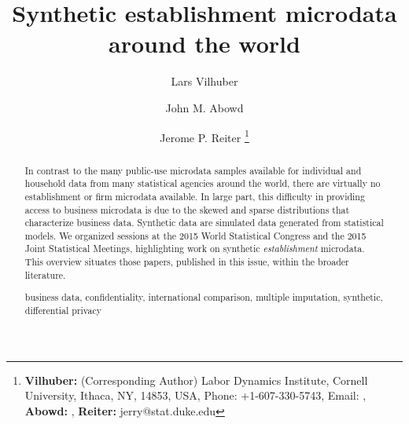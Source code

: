 \documentclass[article,letter]{llncs}
\newcommand{\keywords}[1]{\par\addvspace\baselineskip
\noindent\keywordname\enspace\ignorespaces#1}
\begin{document}
\mainmatter  %

\title{Synthetic establishment microdata around the world}


%
%

\author{Lars Vilhuber
\and John M. Abowd
\and Jerome P. Reiter \thanks{ \textbf{Vilhuber:} (Corresponding Author) Labor Dynamics Institute, Cornell University, Ithaca, NY, 14853, USA, Phone: +1-607-330-5743, Email: , \textbf{Abowd:} ,  \textbf{Reiter:} jerry@stat.duke.edu}}

%

\institute{}
%
%

\toctitle{}
\maketitle


\begin{abstract}
In contrast to the many public-use microdata samples available for individual and household data from many statistical agencies around the world, there are virtually no establishment or firm microdata available. 
In large part, this difficulty in providing access to business microdata is due to the skewed and sparse distributions that characterize business data. Synthetic data are simulated data generated from statistical models. We organized sessions at the 2015 World Statistical Congress and the 2015 Joint Statistical Meetings, highlighting work on synthetic \emph{establishment} microdata. This overview situates those papers, published in this issue, within the broader literature. 
\keywords{business data, confidentiality, international comparison, multiple imputation, synthetic, differential privacy}
\end{abstract}
\end{document}
